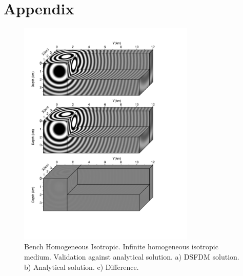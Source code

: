 \chapter*{Appendix} \label{appendix}

\begin{figure}[!h]
\centering 
\includegraphics[width=0.75\textwidth]{images/dsfdm/fig_cube_homogeneous_isotropic.pdf}
\caption{Bench Homogeneous Isotropic. Infinite homogeneous isotropic medium. Validation against analytical solution. a) DSFDM solution. b) Analytical solution. c) Difference.}
\label{cube_homogeneous_isotropic} 
\end{figure}
